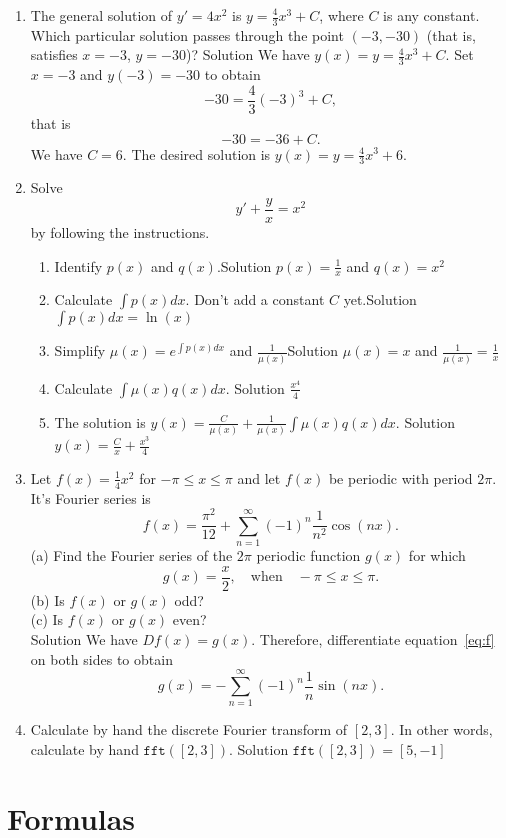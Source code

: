 \documentclass[12pt]{article}
\newcommand{\ratkaisu}[1]{{\color{blue}\quad\textrm{Solution } #1}}
\begin{document}
\begin{enumerate}
\item The general solution of $y'=4x^2$ is $y=\frac{4}{3}x^3+C$, where $C$ is any constant. Which particular solution passes through the point $(-3,-30)$ (that is, satisfies $x=-3$, $y=-30$)?
\ratkaisu{We have $y(x)=y=\frac{4}{3}x^3+C.$ Set $x=-3$ and $y(-3)=-30$ to obtain
$$
-30=\frac{4}{3}(-3)^3+C,
$$
that is
$$
-30=-36+C.
$$
We have $C=6$. The desired solution is $y(x)=y=\frac{4}{3}x^3+6$.
}
\item Solve
$$
y'+\frac{y}{x}=x^2
$$
by following the instructions.
\begin{enumerate}
\item Identify $p(x)$ and $q(x)$.\ratkaisu{$p(x)=\frac{1}{x}$ and $q(x)=x^2$}
\item Calculate $\int p(x)dx$. Don't add a constant $C$ yet.\ratkaisu{$\int p(x)dx=\ln(x)$}
\item Simplify $\mu(x)=e^{\int p(x)dx}$ and $\frac{1}{\mu(x)}$\ratkaisu{$\mu(x)=x$ and $\frac{1}{\mu(x)}=\frac{1}{x}$}
\item Calculate $\int \mu(x)q(x)dx$.
\ratkaisu{$\frac{x^4}{4}$}
\item The solution is $y(x)=\frac{C}{\mu(x)}+\frac{1}{\mu(x)}\int \mu(x)q(x)dx$.
\ratkaisu{$y(x)=\frac{C}{x}+\frac{x^3}{4}$}
\end{enumerate}
\item Let $f(x)=\frac{1}{4}x^2$ for $-\pi\leq x\leq \pi$ and let $f(x)$ be periodic with period $2\pi$. It's Fourier series is
\begin{equation}
\label{eq:f}
f(x)=\frac{\pi^2}{12}
+\sum_{n=1}^\infty (-1)^n\frac{1}{n^2}\cos(nx).
\end{equation}
(a) Find the Fourier series of the $2\pi$ periodic function $g(x)$ for which 
$$
g(x)=\frac{x}{2},\quad\textrm{when}\quad -\pi\leq x\leq\pi.
$$
(b) Is $f(x)$ or $g(x)$ odd?\\
(c) Is $f(x)$ or $g(x)$ even?\\
\ratkaisu{We have $Df(x)=g(x)$. Therefore, differentiate equation~\eqref{eq:f} on both sides to obtain
$$
g(x)=-\sum_{n=1}^\infty (-1)^n\frac{1}{n}\sin(nx).
$$
}

\item Calculate by hand the discrete Fourier transform of $[2,3]$. In other words, calculate by hand $\texttt{fft}([2,3])$.
\ratkaisu{$\texttt{fft}([2,3])=[5,-1]$}
\end{enumerate}

\newpage
\section*{Formulas}
\end{document}

